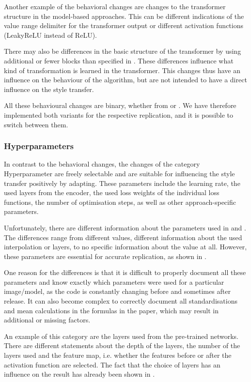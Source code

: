 Another example of the behavioral changes are changes to the transformer structure in the model-based approaches. This can be different indications of the value range delimiter for the transformer output or different activation functions (LeakyReLU instead of ReLU). 

There may also be differences in the basic structure of the transformer by using additional or fewer blocks than specified in \paper{}. These differences influence what kind of transformation is learned in the transformer. This changes thus have an influence on the behaviour of the algorithm, but are not intended to have a direct influence on the style transfer.

All these behavioural changes are binary, whether from \paper{} or \implementation{}. We have therefore implemented both variants for the respective replication, and it is possible to switch between them.

\subsubsection{Hyperparameters}
In contrast to the behavioral changes, the changes of the category Hyperparameter are freely selectable and are suitable for influencing the style transfer positively by adapting. These parameters include the learning rate, the used layers from the encoder, the used loss weights of the individual loss functions, the number of optimisation steps, as well as other approach-specific parameters. 

Unfortunately, there are different information about the parameters used in \paper{} and \implementation{}. The differences range from different values, different information about the used interpolation or layers, to no specific information about the value at all. However, these parameters are essential for accurate replication, as shown in . 

One reason for the differences is that it is difficult to properly document all these parameters and know exactly which parameters were used for a particular image/model, as the code is constantly changing before and sometimes after release. It can also become complex to correctly document all standardisations and mean calculations in the formulas in the paper, which may result in additional or missing factors. 

An example of this category are the layers used from the pre-trained networks. There are different statements about the depth of the layers, the number of the layers used and the feature map, i.e. whether the features before or after the activation function are selected. The fact that the choice of layers has an influence on the result has already been shown in . 

